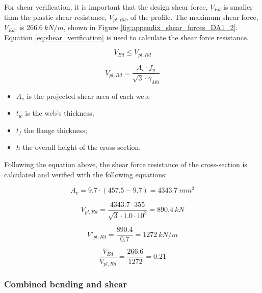 For shear verification, it is important that the design shear force, $V_{Ed}$ is smaller than the plastic shear resistance, $V_{pl,Rd}$, of the profile. The maximum shear force, $V_{Ed}$, is $266.6 \ kN/m$, shown in Figure \ref{fig:appendix_shear_forces_DA1_2}. Equation \ref{eq:shear_verification} is used to calculate the shear force resistance.

\begin{equation}
    V_{Ed} \leq V_{pl,Rd}
    \label{eq:shear_plastic}
\end{equation}

\begin{equation}
    V_{pl,Rd} = \frac{A_v \cdot f_{y}}{\sqrt{3} \cdot \gamma_{M0}}
    \label{eq:shear_verification}
\end{equation}

\begin{itemize}
    \item $A_{v}$ is the projected shear area of each web;
    \item $t_w$ is the web’s thickness;
    \item $t_f$ the flange thickness;
    \item $h$ the overall height of the cross-section.
\end{itemize}

Following the equation above, the shear force resistance of the cross-section is calculated and verified with the following equations:

\begin{equation}
    A_v = 9.7 \cdot (457.5 - 9.7) = 4343.7 \ mm^2
\end{equation}

\begin{equation}
    V_{pl,Rd} = \frac{4343.7 \cdot 355}{\sqrt{3} \cdot 1.0 \cdot 10^3} = 890.4 \ kN 
\end{equation}

\begin{equation}
    V'_{pl,Rd} = \frac{890.4}{0.7} = 1272 \ kN/m 
\end{equation}

\begin{equation}
    \frac{V_{Ed}}{V_{pl,Rd}} = \frac{266.6}{1272} = 0.21 
\end{equation}

\subsubsection{Combined bending and shear}

